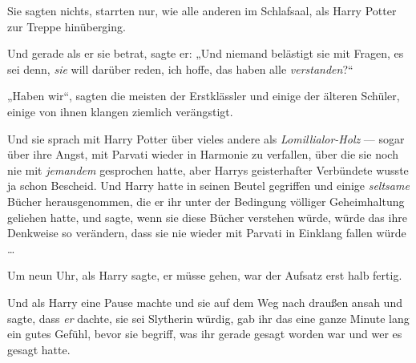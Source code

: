 Sie sagten nichts, starrten nur, wie alle anderen im Schlafsaal, als Harry Potter zur Treppe hinüberging.

Und gerade als er sie betrat, sagte er:
„Und niemand belästigt sie mit Fragen, es sei denn, \emph{sie} will darüber reden, ich hoffe, das haben alle \emph{verstanden}?“

„Haben wir“, sagten die meisten der Erstklässler und einige der älteren Schüler, einige von ihnen klangen ziemlich verängstigt.

\later

Und sie sprach mit Harry Potter über vieles andere als \emph{Lomillialor-Holz} — sogar über ihre Angst, mit Parvati wieder in Harmonie zu verfallen, über die sie noch nie mit \emph{jemandem} gesprochen hatte, aber Harrys geisterhafter Verbündete wusste ja schon Bescheid. Und Harry hatte in seinen Beutel gegriffen und einige \emph{seltsame} Bücher herausgenommen, die er ihr unter der Bedingung völliger Geheimhaltung geliehen hatte, und sagte, wenn sie diese Bücher verstehen würde, würde das ihre Denkweise so verändern, dass sie nie wieder mit Parvati in Einklang fallen würde …

Um neun Uhr, als Harry sagte, er müsse gehen, war der Aufsatz erst halb fertig.

Und als Harry eine Pause machte und sie auf dem Weg nach draußen ansah und sagte, dass \emph{er} dachte, sie sei Slytherin würdig, gab ihr das eine ganze Minute lang ein gutes Gefühl, bevor sie begriff, was ihr gerade gesagt worden war und wer es gesagt hatte.


